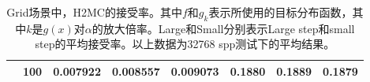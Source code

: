 \begin{table}[hb]
\begin{tabular}{|c|c|c|c|c|c|c|c|}
\cline{2-8} & 100 & 0.007922 & 0.008557 & 0.009073 & 0.1880 & 0.1889 & 0.1879\\
\hline
\end{tabular}
\caption{Grid场景中，H2MC的接受率。其中$f$和$g_k$表示所使用的目标分布函数，其中$k$是$g(x)$对$\alpha$的放大倍率。Large和Small分别表示Large step和small step的平均接受率。以上数据为32768 spp测试下的平均结果。}
\label{tab:accept}
\end{table}

\clearpage


\clearpage



